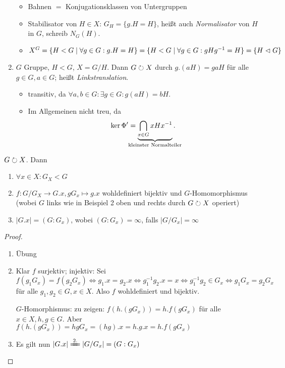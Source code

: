 \documentclass[12pt,a4paper]{scrartcl}
\begin{document}
\begin{bsp}
\begin{enumerate}
		\begin{itemize}[itemsep=-3pt]
			\item Bahnen $=$ Konjugationsklassen von Untergruppen
			\item Stabilisator von $H\in X$: $G_H = \{ g.H = H \}$, heißt auch \emph{Normalisator} von $H$ in $G$, schreib $N_G(H)$.
			\item $X^G = \{ H < G \mid \forall g \in G: g.H = H \}=\{ H < G \mid \forall g \in G: gHg^{-1} = H \} = \{H \vartriangleleft G \}$
		\end{itemize}
		\item $G$ Gruppe, $H < G$, $X = G/H$. Dann $G \circlearrowright X$ durch $g.(aH) = gaH$ für alle $g\in G, a \in G$; heißt \emph{Linkstranslation}.
		\begin{itemize}[itemsep=-3pt]
			\item transitiv, da $\forall a,b \in G: \exists g \in G: g(aH)=bH$.
			\item Im Allgemeinen nicht treu, da \[\ker\Phi' = \underbrace{\bigcap_{x \in G}xHx^{-1}}_{\mathclap{\text{kleinster Normalteiler}}}.\]
		\end{itemize}
	\end{enumerate}
\end{bsp}

\begin{lem}
	$G\circlearrowright X$. Dann
	\begin{enumerate}
		\item $\forall x\in X: G_X<G$
		\item $f\colon G/G_X\to G.x, gG_x\mapsto g.x$ wohldefiniert bijektiv und $G$-Homomorphismus (wobei $G$ links wie in Beispiel 2 oben und rechts durch $G\circlearrowright X$ operiert)
		\item $|G.x| = (G:G_x)$, wobei $(G:G_x) = \infty$, falls $|G/G_x |=\infty$
	\end{enumerate}
\end{lem}

\begin{proof}
	\leavevmode
	\begin{enumerate}
		\item Übung
		\item Klar $f$ surjektiv; injektiv: Sei $f(g_1G_x) = f(g_2G_x)\Leftrightarrow g_1.x = g_2.x\Leftrightarrow g_1^{-1}g_2.x = x \Leftrightarrow g_1^{-1}g_2\in G_x \Leftrightarrow g_1G_x = g_2G_x$ für alle $g_1,g_2 \in G, x\in X$. Also $f$ wohldefiniert und bijektiv.
		
		$G$-Homorphismus: zu zeigen: $f(h.(gG_x)) = h.f(gG_x)$ für alle $x\in X, h,g\in G$. Aber $f(h.(gG_x)) = hgG_x = (hg).x = h.g.x = h.f(gG_x)$
		\item Es gilt nun $|G.x|\xeq{2.} |G/G_x| = (G:G_x)$
	\end{enumerate}
\end{proof}
\end{document}
